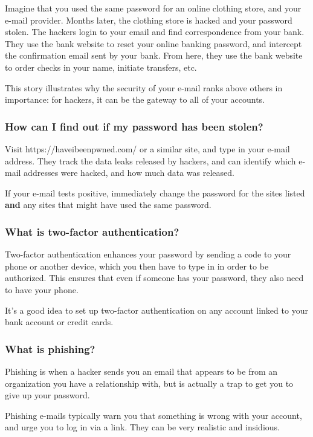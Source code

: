 Imagine that you used the same password for an online clothing store, and your e-mail provider. Months later, the clothing store is hacked and your password stolen. The hackers login to your email and find correspondence from your bank. They use the bank website to reset your online banking password, and intercept the confirmation email sent by your bank. From here, they use the bank website to order checks in your name, initiate transfers, etc.

This story illustrates why the security of your e-mail ranks above others in importance: for hackers, it can be the gateway to all of your accounts.

\subsubsection{How can I find out if my password has been stolen?}

Visit https://haveibeenpwned.com/ or a similar site, and type in your e-mail address. They track the data leaks released by hackers, and can identify which e-mail addresses were hacked, and how much data was released.

If your e-mail tests positive, immediately change the password for the sites listed \textbf{and} any sites that might have used the same password. 

\subsubsection{What is two-factor authentication?}

Two-factor authentication enhances your password by sending a code to your phone or another device, which you then have to type in in order to be authorized. This ensures that even if someone has your password, they also need to have your phone.

It's a good idea to set up two-factor authentication on any account linked to your bank account or credit cards.

\subsubsection{What is phishing?}

Phishing is when a hacker sends you an email that appears to be from an organization you have a relationship with, but is actually a trap to get you to give up your password.

Phishing e-mails typically warn you that something is wrong with your account, and urge you to log in via a link. They can be very realistic and insidious.

